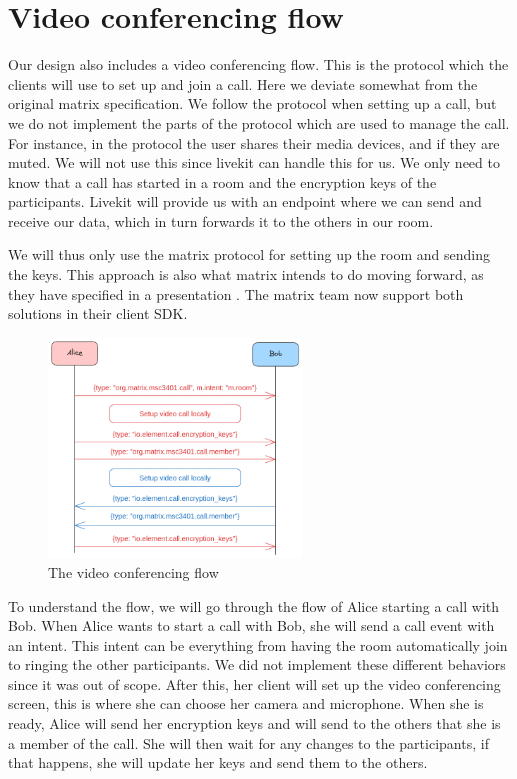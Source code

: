 \documentclass{report}
\begin{document}
\section{Video conferencing flow}
Our design also includes a video conferencing flow. This is the protocol which the clients will use to set up and
join a call. Here we deviate somewhat from the original matrix specification. We follow the protocol when setting up a
call, but we do not implement the parts of the protocol which are used to manage the call. For instance, in the protocol
the user shares their media devices, and if they are muted. We will not use this since livekit can handle this for
us. We only need to know that a call has started in a room and the encryption keys of the participants. Livekit will
provide us with an endpoint where we can send and receive our data, which in turn forwards it to the others in our room.

We will thus only use the matrix protocol for setting up the room and sending the keys. This approach is also what
matrix intends to do moving forward, as they have specified in a presentation \cite{nirve_matrixrtc_nodate}. The
matrix team now support both solutions in their client SDK.

\begin{figure}
\centering
\includegraphics[width=0.6\textwidth]{img/Callflow.excalidraw.png}
\caption{The video conferencing flow}
\label{fig:video-conference-flow}
\end{figure}

To understand the flow, we will go through the flow of Alice starting a call with Bob.
When Alice wants to start a call with Bob, she will send a call event with an intent. This intent can be
everything from having the room automatically join to ringing the other participants. We did not implement
these different behaviors since it was out of scope. After this, her client will set up the video conferencing
screen, this is where she can choose her camera and microphone. When she is ready, Alice will send her encryption
keys and will send to the others that she is a member of the call. She will then wait for any changes to the
participants,
    if that happens, she will update her keys and send them to the others.
\end{document}
